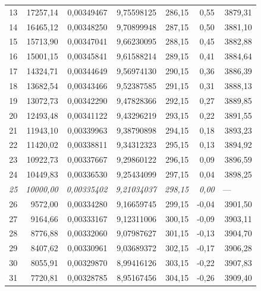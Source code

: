 \documentclass[12pt,a4paper,final,twoside,fleqn]{article}
\begin{document}
\begin{ThreePartTable}
\begin{longtable}{rrrrrrr}
13           & 17257,14  & 0,00349467    & 9,75598125  & 286,15     & 0,55       & 3879,31 \\
14           & 16465,12  & 0,00348250    & 9,70899948  & 287,15     & 0,50       & 3881,10 \\
15           & 15713,90  & 0,00347041    & 9,66230095  & 288,15     & 0,45       & 3882,88 \\
16           & 15001,15  & 0,00345841    & 9,61588214  & 289,15     & 0,41       & 3884,64 \\
17           & 14324,71  & 0,00344649    & 9,56974130  & 290,15     & 0,36       & 3886,39 \\
18           & 13682,54  & 0,00343466    & 9,52387585  & 291,15     & 0,31       & 3888,13 \\
19           & 13072,73  & 0,00342290    & 9,47828366  & 292,15     & 0,27       & 3889,85 \\
20           & 12493,48  & 0,00341122    & 9,43296219  & 293,15     & 0,22       & 3891,55 \\
21           & 11943,10  & 0,00339963    & 9,38790898  & 294,15     & 0,18       & 3893,23 \\
22           & 11420,02  & 0,00338811    & 9,34312323  & 295,15     & 0,13       & 3894,92 \\
23           & 10922,73  & 0,00337667    & 9,29860122  & 296,15     & 0,09       & 3896,59 \\
24           & 10449,83  & 0,00336530    & 9,25434099  & 297,15     & 0,04       & 3898,25 \\
\textsl{25}           & \textsl{10000,00}  & \textsl{0,00335402}    & \textsl{9,21034037}  & \textsl{298,15}     & \textsl{0,00}       &   ---\tnote{b}\ \ \ \ \     \\
26           & 9572,00   & 0,00334280    & 9,16659745  & 299,15     & -0,04      & 3901,50 \\
27           & 9164,66   & 0,00333167    & 9,12311006  & 300,15     & -0,09      & 3903,11 \\
28           & 8776,88   & 0,00332060    & 9,07987627  & 301,15     & -0,13      & 3904,70 \\
29           & 8407,62   & 0,00330961    & 9,03689372  & 302,15     & -0,17      & 3906,28 \\
30           & 8055,91   & 0,00329870    & 8,99416126  & 303,15     & -0,22      & 3907,83 \\
31           & 7720,81   & 0,00328785    & 8,95167456  & 304,15     & -0,26      & 3909,40 \\

\end{longtable}
\end{ThreePartTable}
\end{document}
